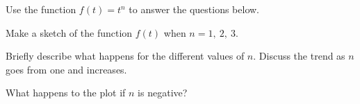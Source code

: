 \begin{problem}
  \clearpage

\item Use the function $f(t)=t^n$ to answer the questions below.

  \scalebox{0.7}{}

  \begin{subproblem}
  \item Make a sketch of the function $f(t)$ when $n=1,~2,~3$.
  \item Briefly describe what happens for the different values of
    $n$. Discuss the trend as $n$ goes from one and increases.
    \vfill
  \item What happens to the plot if $n$ is negative?
    \vfill
  \end{subproblem}


\end{problem}

